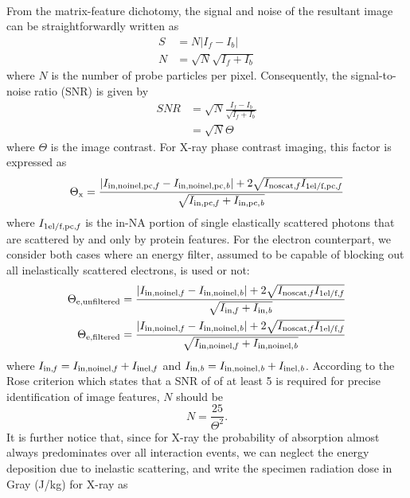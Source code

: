 \documentclass[]{article}
\newcommand\inelb{\textup{\scriptsize{inel,\textit b}}}
\newcommand\innoinelb{\textup{\scriptsize{in,noinel,\textit b}}}
\newcommand\innoinelpcb{\textup{\scriptsize{in,noinel,pc,\textit b}}}
\newcommand\inb{\textup{\scriptsize{in,\textit b}}}
\newcommand\inpcb{\textup{\scriptsize{in,pc,\textit b}}}
\newcommand\inelf{\textup{\scriptsize{inel,\textit f}}}
\newcommand\noscatf{\textup{\scriptsize{noscat,\textit f}}}
\newcommand\selff{\textup{\scriptsize{1el/f,\textit f}}}
\newcommand\innoinelf{\textup{\scriptsize{in,noinel,\textit f}}}
\newcommand\innoinelpcf{\textup{\scriptsize{in,noinel,pc,\textit f}}}
\newcommand\selfpcf{\textup{\scriptsize{1el/f,pc,\textit f}}}
\newcommand\inff{\textup{\scriptsize{in,\textit f}}}
\newcommand\inpcf{\textup{\scriptsize{in,pc,\textit f}}}
\begin{document}
\paragraph{} From the matrix-feature dichotomy, the signal and noise of the resultant image can be straightforwardly written as 
\begin{align}
S &= N|I_f-I_b| \\
N &= \sqrt{N}\sqrt{I_f+I_b}
\end{align}
where $N$ is the number of probe particles per pixel. Consequently, the signal-to-noise ratio (SNR) is given by \cite{Sun:2015fr}
\begin{equation}
\begin{aligned}
\textit{SNR} &= \sqrt{N}\frac{I_f-I_b}{\sqrt{I_f+I_b}} \\ &= \sqrt{N}\Theta
\end{aligned}
\end{equation}
where $\Theta$ is the image contrast. For X-ray phase contrast imaging, this factor is expressed as
\begin{equation}
\Theta_\mathrm{x} = \frac{|I_{\innoinelpcf}-I_{\innoinelpcb}|+2\sqrt{I_{\noscatf}I_{\selfpcf}}}{\sqrt{I_{\inpcf}+I_{\inpcb}}}
\end{equation}
where $I_{\selfpcf}$ is the in-NA portion of single elastically scattered photons that are scattered by and only by protein features. For the electron counterpart, we consider both cases where an energy filter, assumed to be capable of blocking out all inelastically scattered electrons, is used or not:
\begin{align}
\Theta_{\mathrm{e,unfiltered}} &= \frac{|I_{\innoinelf}-I_{\innoinelb}|+2\sqrt{I_{\noscatf}I_{\selff}}}{\sqrt{I_{\inff}+I_{\inb}}} \\
\Theta_{\mathrm{e,filtered}} &= \frac{|I_{\innoinelf}-I_{\innoinelb}|+2\sqrt{I_{\noscatf}I_{\selff}}}{\sqrt{I_{\innoinelf}+I_{\innoinelb}}}
\end{align}
where $I_{\inff} = I_{\innoinelf} + I_{\inelf}$ and $I_{\inb} = I_{\innoinelb} + I_{\inelb}$. According to the Rose criterion which states that a SNR of of at least 5 is required for precise identification of image features, $N$ should be
\begin{equation}
N = \frac{25}{\Theta^2}.
\end{equation}
It is further notice that, since for X-ray the probability of absorption almost always predominates over all interaction events, we can neglect the energy deposition due to inelastic scattering, and write the specimen radiation dose in Gray (J/kg) for X-ray as 
\end{document}
